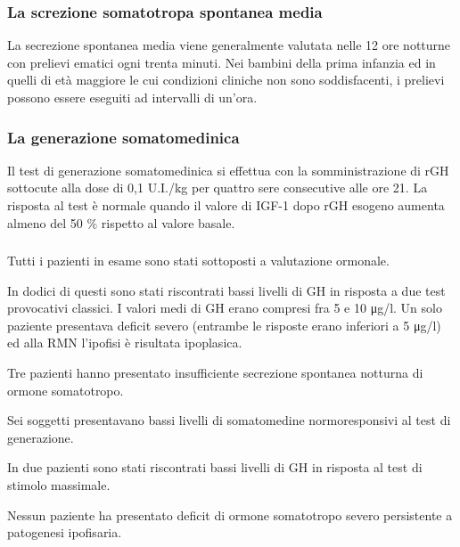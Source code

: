 \subsubsection*{La screzione somatotropa spontanea media}
La secrezione spontanea media viene generalmente valutata nelle 12 ore notturne con prelievi ematici ogni trenta minuti. Nei bambini della prima infanzia ed in quelli di età maggiore le cui condizioni cliniche non sono soddisfacenti, i prelievi possono essere eseguiti ad intervalli di un'ora.

\subsubsection*{La generazione somatomedinica}
Il test di generazione somatomedinica si effettua con la somministrazione di rGH sottocute alla dose di 0,1 U.I./kg per quattro sere consecutive alle ore 21. La risposta al test è normale quando il valore di IGF-1 dopo rGH esogeno aumenta almeno del 50 \%
rispetto al valore basale.

\subsubsection*{}
Tutti i pazienti in esame sono stati sottoposti a valutazione ormonale. 

In dodici di questi sono stati riscontrati bassi livelli di GH in risposta a due test provocativi classici. I valori medi di GH erano compresi fra 5 e 10 \unit{\micro g}/l. Un solo paziente presentava deficit severo (entrambe le risposte erano inferiori a 5 \unit{\micro g}/l) ed alla RMN l'ipofisi è risultata ipoplasica.

Tre pazienti hanno presentato insufficiente secrezione spontanea notturna di ormone somatotropo.

Sei soggetti presentavano bassi livelli di somatomedine normoresponsivi al test di generazione.


In due pazienti sono stati riscontrati bassi livelli di GH in risposta al test di stimolo massimale.

Nessun paziente ha presentato deficit di ormone somatotropo severo persistente a patogenesi ipofisaria. 
